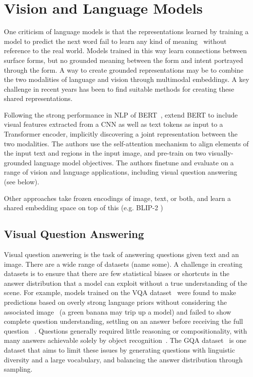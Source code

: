 \section{Vision and Language Models}
\label{sec:vlm}

One criticism of language models is that the representations learned by
training a model to predict the next word fail to learn any kind of
meaning~\citep{bender2020climbing} without reference to the real world. Models
trained in this way learn connections between surface forms, but no grounded
meaning between the form and intent portrayed through the form. A way to create
grounded representations may be to combine the two modalities of language and
vision through multimodal embeddings. A key challenge in recent years has been
to find suitable methods for creating these shared representations.

Following the strong performance in NLP of BERT~\citep{devlin2019bert},
\cite{li2019visualbert} extend BERT to include visual features extracted from a
CNN as well as text tokens as input to a Transformer encoder, implicitly
discovering a joint representation between the two modalities. The authors use
the self-attention mechanism to align elements of the input text and regions in
the input image, and pre-train on two visually-grounded language model
objectives. The authors finetune and evaluate on a range of vision and language
applications, including visual question answering (see below).


Other approaches take frozen encodings of image, text, or both, and learn a
shared embedding space on top of this (e.g. BLIP-2 \cite{li2023blip2})



\subsection{Visual Question Answering}
\label{ssec:vqa}

Visual question answering is the task of answering questions given text and an
image. There are a wide range of datasets (name some). A challenge in creating
datasets is to ensure that there are few statistical biases or shortcuts in the
answer distribution that a model can exploit without a true understanding of
the scene. For example, models trained on the VQA dataset~\citep{antol2015vqa}
were found to make predictions based on overly strong language priors without
considering the associated image~\cite{zhang2016yin} (a green banana may trip
up a model) and failed to show complete question understanding, settling on an
answer before receiving the full question ~\cite{agrawal2016analyzing}.
Questions generally required little reasoning or compositionality, with many
answers achievable solely by object recognition~\citep{hudson2019gqa}. The GQA
dataset~\citep{hudson2019gqa} is one dataset that aims to limit these issues
by generating questions with linguistic diversity and a large vocabulary, and
balancing the answer distribution through sampling. 

